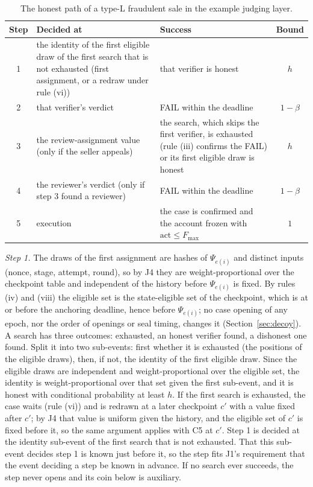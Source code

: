 \documentclass[10pt,a4paper]{article}
\newcommand{\Fmax}{F_{\max}}
\theoremstyle{plain}
\theoremstyle{remark}
\begin{document}
\begin{table}[!htbp]
\centering
\caption{The honest path of a type-L fraudulent sale in the example judging layer.}
\label{tab:steps}
\footnotesize
\begin{tabular}{@{}cp{5.2cm}p{5.6cm}c@{}}
\toprule
Step & Decided at & Success & Bound \\
\midrule
1 & the identity of the first eligible draw of the first search that is not exhausted (first assignment, or a redraw under rule (vi)) & that verifier is honest & $h$ \\
2 & that verifier's verdict & FAIL within the deadline & $1-\beta$ \\
3 & the review-assignment value (only if the seller appeals) & the search, which skips the first verifier, is exhausted (rule (iii) confirms the FAIL) or its first eligible draw is honest & $h$ \\
4 & the reviewer's verdict (only if step 3 found a reviewer) & FAIL within the deadline & $1-\beta$ \\
5 & execution & the case is confirmed and the account frozen with $\mathrm{act}\le\Fmax$ & $1$ \\
\bottomrule
\end{tabular}
\end{table}

\emph{Step 1.} The draws of the first assignment are hashes of $\Psi_{e(i)}$ and distinct inputs (nonce, stage, attempt, round), so by J4 they are weight-proportional over the checkpoint table and independent of the history before $\Psi_{e(i)}$ is fixed. By rules (iv) and (viii) the eligible set is the state-eligible set of the checkpoint, which is at or before the anchoring deadline, hence before $\Psi_{e(i)}$; no case opening of any epoch, nor the order of openings or seal timing, changes it (Section~\ref{sec:decoy}). A search has three outcomes: exhausted, an honest verifier found, a dishonest one found. Split it into two sub-events: first whether it is exhausted (the positions of the eligible draws), then, if not, the identity of the first eligible draw. Since the eligible draws are independent and weight-proportional over the eligible set, the identity is weight-proportional over that set given the first sub-event, and it is honest with conditional probability at least $h$. If the first search is exhausted, the case waits (rule (vi)) and is redrawn at a later checkpoint $c'$ with a value fixed after $c'$; by J4 that value is uniform given the history, and the eligible set of $c'$ is fixed before it, so the same argument applies with C5 at $c'$. Step 1 is decided at the identity sub-event of the first search that is not exhausted. That this sub-event decides step 1 is known just before it, so the step fits J1's requirement that the event deciding a step be known in advance. If no search ever succeeds, the step never opens and its coin below is auxiliary.
\end{document}
